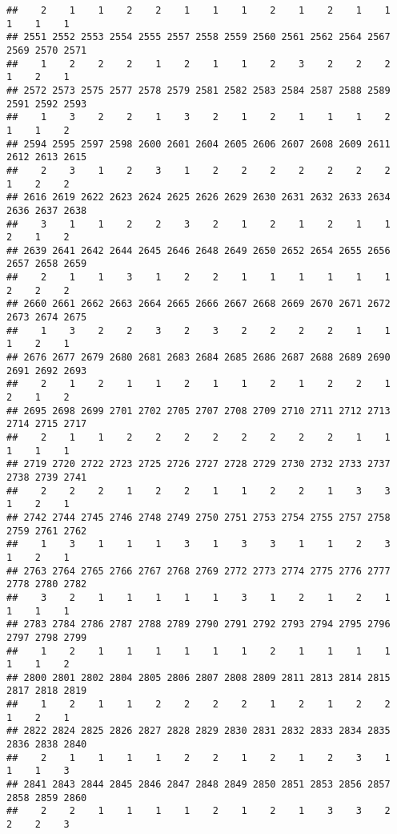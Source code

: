 \documentclass[
]{article}
\begin{document}
\begin{verbatim}
##    2    1    1    2    2    1    1    1    2    1    2    1    1    1    1    1 
## 2551 2552 2553 2554 2555 2557 2558 2559 2560 2561 2562 2564 2567 2569 2570 2571 
##    1    2    2    2    1    2    1    1    2    3    2    2    2    1    2    1 
## 2572 2573 2575 2577 2578 2579 2581 2582 2583 2584 2587 2588 2589 2591 2592 2593 
##    1    3    2    2    1    3    2    1    2    1    1    1    2    1    1    2 
## 2594 2595 2597 2598 2600 2601 2604 2605 2606 2607 2608 2609 2611 2612 2613 2615 
##    2    3    1    2    3    1    2    2    2    2    2    2    2    1    2    2 
## 2616 2619 2622 2623 2624 2625 2626 2629 2630 2631 2632 2633 2634 2636 2637 2638 
##    3    1    1    2    2    3    2    1    2    1    2    1    1    2    1    2 
## 2639 2641 2642 2644 2645 2646 2648 2649 2650 2652 2654 2655 2656 2657 2658 2659 
##    2    1    1    3    1    2    2    1    1    1    1    1    1    2    2    2 
## 2660 2661 2662 2663 2664 2665 2666 2667 2668 2669 2670 2671 2672 2673 2674 2675 
##    1    3    2    2    3    2    3    2    2    2    2    1    1    1    2    1 
## 2676 2677 2679 2680 2681 2683 2684 2685 2686 2687 2688 2689 2690 2691 2692 2693 
##    2    1    2    1    1    2    1    1    2    1    2    2    1    2    1    2 
## 2695 2698 2699 2701 2702 2705 2707 2708 2709 2710 2711 2712 2713 2714 2715 2717 
##    2    1    1    2    2    2    2    2    2    2    2    1    1    1    1    1 
## 2719 2720 2722 2723 2725 2726 2727 2728 2729 2730 2732 2733 2737 2738 2739 2741 
##    2    2    2    1    2    2    1    1    2    2    1    3    3    1    2    1 
## 2742 2744 2745 2746 2748 2749 2750 2751 2753 2754 2755 2757 2758 2759 2761 2762 
##    1    3    1    1    1    3    1    3    3    1    1    2    3    1    2    1 
## 2763 2764 2765 2766 2767 2768 2769 2772 2773 2774 2775 2776 2777 2778 2780 2782 
##    3    2    1    1    1    1    1    3    1    2    1    2    1    1    1    1 
## 2783 2784 2786 2787 2788 2789 2790 2791 2792 2793 2794 2795 2796 2797 2798 2799 
##    1    2    1    1    1    1    1    1    2    1    1    1    1    1    1    2 
## 2800 2801 2802 2804 2805 2806 2807 2808 2809 2811 2813 2814 2815 2817 2818 2819 
##    1    2    1    1    2    2    2    2    1    2    1    2    2    1    2    1 
## 2822 2824 2825 2826 2827 2828 2829 2830 2831 2832 2833 2834 2835 2836 2838 2840 
##    2    1    1    1    1    2    2    1    2    1    2    3    1    1    1    3 
## 2841 2843 2844 2845 2846 2847 2848 2849 2850 2851 2853 2856 2857 2858 2859 2860 
##    2    2    1    1    1    1    2    1    2    1    3    3    2    2    2    3 

\end{verbatim}
\end{document}
